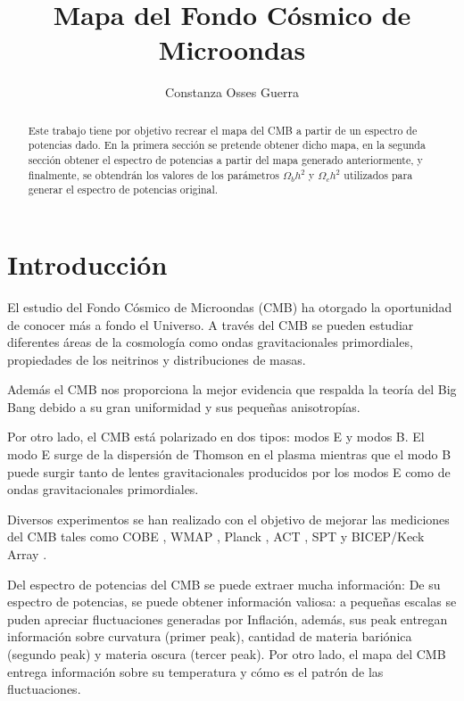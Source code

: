 \documentclass[twocolumn,letterpaper,spanish]{revtex4}
\numberwithin{equation}{section}
\begin{document}
\title{Mapa del Fondo Cósmico de Microondas}
\author{Constanza Osses Guerra}

\begin{abstract}
 Este trabajo tiene por objetivo recrear el mapa del CMB a partir de un espectro de potencias dado. En la primera sección se pretende obtener dicho mapa, en la segunda secci\'on obtener el espectro de potencias a partir del mapa generado anteriormente, y finalmente, se obtendr\'an los valores de los par\'ametros $\Omega_b h^2$ y $\Omega_c h^2$ utilizados para generar el espectro de potencias original.
\end{abstract}


\maketitle
\section{Introducción}

El estudio del Fondo C\'osmico de Microondas (CMB) \cite{cmb} ha otorgado la oportunidad de conocer m\'as a fondo el Universo. A trav\'es del CMB se pueden estudiar diferentes \'areas de la cosmolog\'ia como ondas gravitacionales primordiales, propiedades de los neitrinos y distribuciones de masas.

Adem\'as el CMB nos proporciona la mejor evidencia que respalda la teor\'ia del Big Bang debido a su gran uniformidad y sus peque\~nas anisotrop\'ias. 

Por otro lado, el CMB est\'a polarizado en dos tipos: modos E y modos B. El modo E surge de la dispersi\'on de Thomson en el plasma mientras que el modo B puede surgir tanto de lentes gravitacionales producidos por los modos E como de ondas gravitacionales primordiales.

Diversos experimentos se han realizado con el objetivo de mejorar las mediciones del CMB tales como COBE \cite{cobe}, WMAP \cite{wmap}, Planck \cite{planck}, ACT \cite{act}, SPT y BICEP/Keck Array \cite{bicep}.

Del espectro de potencias del CMB se puede extraer mucha informaci\'on: 
De su espectro de potencias, se puede obtener informaci\'on valiosa: a peque\~nas escalas se puden apreciar fluctuaciones generadas por Inflaci\'on,  adem\'as, sus peak entregan informaci\'on sobre curvatura (primer peak), cantidad de materia bari\'onica (segundo peak) y materia oscura (tercer peak). Por otro lado, el mapa del CMB entrega informaci\'on sobre su temperatura  y c\'omo es el patr\'on de las fluctuaciones.
\end{document}
